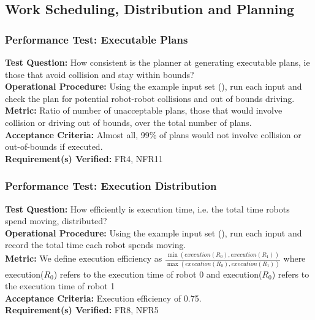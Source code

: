 
\subsection{Work Scheduling, Distribution and Planning}
\label{sec:verification_sdp}

\subsubsection{Performance Test: Executable Plans}
\label{test:sdp_pt_executable}
\textbf{Test Question:} How consistent is the planner at generating executable plans, ie those that avoid collision and stay within bounds? \\
\textbf{Operational Procedure:} Using the example input set (), run each input and check the plan for potential robot-robot collisions and out of bounds driving. \\
\textbf{Metric:} Ratio of number of unacceptable plans, those that would involve collision or driving out of bounds, over the total number of plans. \\
\textbf{Acceptance Criteria:} Almost all, 99\% of plans would not involve collision or out-of-bounds if executed. \\
\textbf{Requirement(s) Verified:} FR4, NFR11

\subsubsection{Performance Test: Execution Distribution}
\label{test:sdp_pt_execu}
\textbf{Test Question:} How efficiently is execution time, i.e. the total time robots spend moving, distributed?\\
\textbf{Operational Procedure:} Using the example input set (), run each input and record the total time each robot spends moving. \\
\textbf{Metric:} We define execution efficiency as $\frac{\min(execution(R_{0}), execution(R_{1}))}{\max(execution(R_{0}), execution(R_{1}))}$ where execution($R_{0}$) refers to the execution time of robot 0 and execution($R_{0}$) refers to the execution time of robot 1\\
\textbf{Acceptance Criteria:} Execution efficiency of 0.75.\\
\textbf{Requirement(s) Verified:} FR8, NFR5

